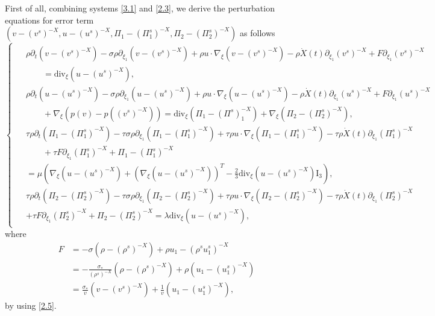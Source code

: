 \documentclass[10pt,reqno]{amsart}
\numberwithin{equation}{section}
\newcommand{\ddiv}{\mathrm{div}}
\begin{document}
First of all, combining systems \eqref{3.1} and \eqref{2.3}, we derive the perturbation equations for error term $\left(v-(v^s)^{-X}, u-(u^s)^{-X},\Pi_1-(\Pi_1^s)^{-X}, \Pi_2-(\Pi_2^s)^{-X}\right)$ as follows
\begin{equation}\label{sys1}
\begin{cases}
\begin{aligned}
&\rho\partial_t\left(v-(v^s)^{-X}\right)-\sigma\rho\partial_{\xi_1}\left(v-(v^s)^{-X}\right)
        +\rho u\cdot\nabla_{\xi}\left(v-(v^s)^{-X}\right)-\rho\dot{X}(t)\partial_{\xi_1}(v^s)^{-X}
        +F\partial_{\xi_1}(v^s)^{-X}\\
 &\qquad=\ddiv_{\xi}\left(u-(u^s)^{-X}\right),\\
&\rho\partial_t\left(u-(u^s)^{-X}\right)-\sigma\rho\partial_{\xi_1}\left(u-(u^s)^{-X}\right)
        +\rho u\cdot\nabla_{\xi}\left(u-(u^s)^{-X}\right)-\rho\dot{X}(t)\partial_{\xi_1}(u^s)^{-X} +F\partial_{\xi_1}(u^s)^{-X}\\
&\qquad  +\nabla_{\xi}\left(p(v)-p((v^s)^{-X})\right)
               =\ddiv_{\xi}\left(\Pi_1-(\Pi^s)_1^{-X}\right)+\nabla_{\xi}\left(\Pi_2-(\Pi_2^s)^{-X}\right),\\
&\tau\rho\partial_t\left(\Pi_1-(\Pi_1^s)^{-X}\right)-\tau\sigma\rho\partial_{\xi_1}\left(\Pi_1-(\Pi_1^s)^{-X}\right)
+\tau\rho u\cdot\nabla_{\xi} \left(\Pi_1-(\Pi_1^s)^{-X}\right)-\tau\rho\dot{X}(t)\partial_{\xi_1}(\Pi_1^s)^{-X}\\
&\qquad +\tau F\partial_{\xi_1}(\Pi_1^s)^{-X}+\Pi_1-(\Pi_1^s)^{-X}\\
 &  =\mu\left(\nabla_{\xi}\left(u-(u^s)^{-X}\right)+\left(\nabla_{\xi}\left(u-(u^s)^{-X}\right)\right)^T
   -\frac{2}{3}\ddiv_{\xi}\left(u-(u^s)^{-X}\right) \mathrm{I}_3\right),\\
&\tau\rho\partial_t\left(\Pi_2-(\Pi_2^s)^{-X}\right)-\tau\sigma\rho\partial_{\xi_1}\left(\Pi_2-(\Pi_2^s)^{-X}\right)
+\tau\rho u\cdot\nabla_{\xi} \left(\Pi_2-(\Pi_2^s)^{-X}\right)-\tau\rho\dot{X}(t)\partial_{\xi_1}(\Pi_2^s)^{-X}\\
&+\tau F\partial_{\xi_1}(\Pi_2^s)^{-X}+\Pi_2-(\Pi_2^s)^{-X}
=\lambda\ddiv_{\xi} \left(u-(u^s)^{-X}\right),
\end{aligned}
\end{cases}
\end{equation}
where
\begin{equation}\label{wcxf}
\begin{aligned}
F&=-\sigma\left(\rho-(\rho^s)^{-X}\right)+\rho u_1-(\rho^su_1^s)^{-X}\\
 &=-\frac{\sigma_\ast}{(\rho^s)^{-X}}\left(\rho-(\rho^s)^{-X}\right)+\rho\left(u_1-(u_1^s)^{-X}\right)\\
 &=\frac{\sigma_\ast}{v}\left(v-(v^s)^{-X}\right)+\frac{1}{v}\left(u_1-(u_1^s)^{-X}\right),
\end{aligned}
\end{equation}
by using \eqref{2.5}.
\end{document}
